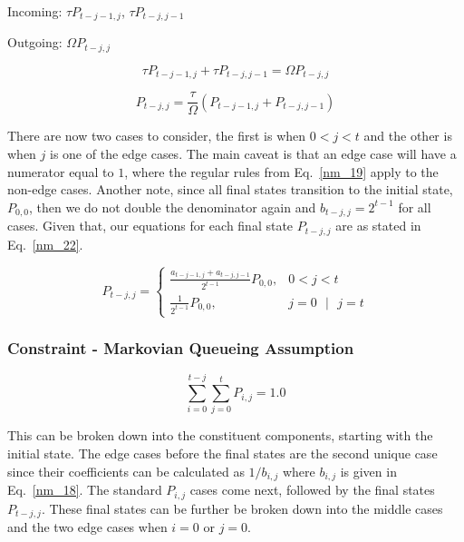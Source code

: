 \documentclass[conference]{IEEEtran}
\begin{document}
Incoming: $\tau P_{t-j-1,j}$, $\tau P_{t-j,j-1}$

Outgoing: $\Omega P_{t-j,j}$

\begin{equation}
  \tau P_{t-j-1,j} + \tau P_{t-j,j-1} = \Omega P_{t-j,j}\label{nm_21}
\end{equation}

\begin{equation}
  P_{t-j,j} = \frac{\tau}{\Omega} (P_{t-j-1,j} + P_{t-j,j-1})\label{nm_21}
\end{equation}

There are now two cases to consider, the first is when $0<j<t$ and the
other is when $j$ is one of the edge cases. The main caveat is that an 
edge case will have a numerator equal to $1$, where the regular rules
from Eq.~\ref{nm_19} apply to the non-edge cases. Another note, since 
all final states transition to the initial state, $P_{0,0}$, then we do not 
double the denominator again and $b_{t-j,j} = 2^{t-1}$ for all cases. Given 
that, our equations for each final state $P_{t-j,j}$ are as stated in Eq.~\ref{nm_22}.

\begin{equation}
  P_{t-j,j} =
    \begin{cases}
      \frac{a_{t-j-1,j} + a_{t-j,j-1}}{2^{t-1}}P_{0,0},                            & 0 < j < t \\
      \frac{1}{2^{t-1}}P_{0,0},  & j = 0 \text{ } |\text{ } j = t
    \end{cases}
    \label{nm_22}
\end{equation}

\subsubsection{Constraint - Markovian Queueing Assumption}

\begin{equation}
  \sum_{i=0}^{t-j}{\sum_{j=0}^{t}{P_{i,j}}} = 1.0\label{nm_23}
\end{equation}

This can be broken down into the constituent components, starting with the
initial state. The edge cases before the final states are the second unique case
since their coefficients can be calculated as $1/b_{i,j}$ where $b_{i,j}$ is given in 
Eq.~\ref{nm_18}. The standard $P_{i,j}$ cases come next, followed by the final
states $P_{t-j,j}$. These final states can be further be broken down into the 
middle cases and the two edge cases when $i = 0$ or $j = 0$. 
\end{document}
